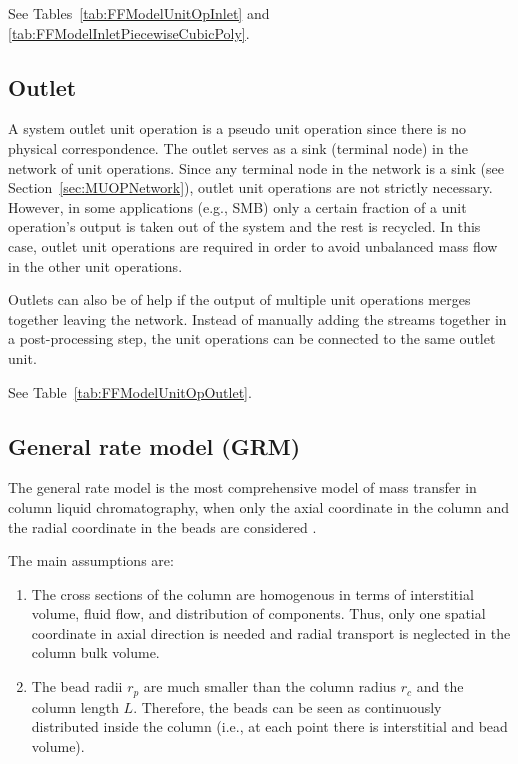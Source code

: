 See Tables~\ref{tab:FFModelUnitOpInlet} and \ref{tab:FFModelInletPiecewiseCubicPoly}.

\subsection{Outlet}\label{sec:MUOPOutlet}

A system outlet unit operation  is a pseudo unit operation since there is no physical correspondence.
The outlet serves as a sink (terminal node) in the network of unit operations.
Since any terminal node in the network is a sink (see Section~\ref{sec:MUOPNetwork}), outlet unit operations are not strictly necessary.
However, in some applications (e.g., SMB) only a certain fraction of a unit operation's output is taken out of the system and the rest is recycled.
In this case, outlet unit operations are required in order to avoid unbalanced mass flow in the other unit operations.

Outlets can also be of help if the output of multiple unit operations merges together leaving the network.
Instead of manually adding the streams together in a post-processing step, the unit operations can be connected to the same outlet unit.

See Table~\ref{tab:FFModelUnitOpOutlet}.

\subsection{General rate model (GRM)}\label{sec:MUOPGRM}

The general rate model  is the most comprehensive model of mass transfer in column liquid chromatography, when only the axial coordinate in the column and the radial coordinate in the beads are considered \cite{Kucera1965,Gu1995,Guiochon2006,Felinger2004}.

The main assumptions are:
\begin{enumerate}
	\item The cross sections of the column are homogenous in terms of interstitial volume, fluid flow, and distribution of components. Thus, only one spatial coordinate in axial direction is needed and radial transport is neglected in the column bulk volume.
	\item The bead radii $r_{p}$ are much smaller than the column radius $r_c$ and the column length $L$. Therefore, the beads can be seen as continuously distributed inside the column (i.e., at each point there is interstitial and bead volume).
\end{enumerate}

